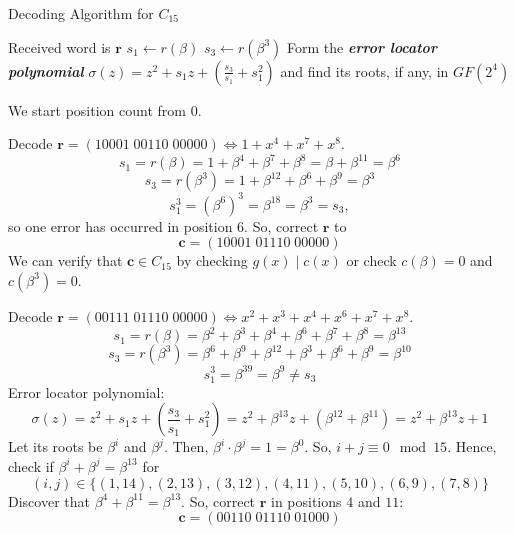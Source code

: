 \begin{algbox}
    \begin{algorithm}[H]
        \DontPrintSemicolon{}
        \caption{Decoding Algorithm for $ C_{15} $}
        Received word is $ \bm{r} $\;
        $ s_1\gets r(\beta) $\;
        $ s_3\gets r(\beta^3) $\;
         {
        }
         {
         {
        }
        }
         {
            \Return{}
        }
        Form the \textbf\emph{{error locator polynomial}}
        $ \sigma(z)=z^2+s_1z+\left( \frac{s_3}{s_1} +s_1^2 \right) $ and find its
        roots, if any, in $ GF(2^4) $\;
         {
        }
        \Return{}
    \end{algorithm}
\end{algbox}

\begin{remark}
    We start position count from $ 0 $.
\end{remark}

\begin{exbox}
    \begin{example}[Decoding $ C_{15} $]
        Decode $ \bm{r}=(10001\; 00110\; 00000)\iff 1+x^4+x^7+x^8 $.
        \[ s_1=r(\beta)=1+\beta^4+\beta^7+\beta^8=\beta+\beta^{11}=\beta^6 \]
        \[ s_3=r(\beta^3)=1+\beta^{12}+\beta^{6}+\beta^9=\beta^3 \]
        \[ s_1^3=(\beta^6)^3=\beta^{18}=\beta^3=s_3, \]
        so one error has occurred in position $ 6 $. So, correct $ \bm{r} $ to
        \[ \bm{c}=(10001\; 01110\; 00000) \]
        We can verify that $ \bm{c}\in C_{15} $ by checking $ g(x)\mid c(x) $
        or check $ c(\beta)=0 $ and $ c(\beta^3)=0 $.
    \end{example}
\end{exbox}

\begin{exbox}
    \begin{example}[Decoding $ C_{15} $]
        Decode $ \bm{r}=(00111\; 01110\; 00000)\iff x^2+x^3+x^4+x^6+x^7+x^8 $.
        \[ s_1=r(\beta)=\beta^2+\beta^3+\beta^4+\beta^6+\beta^7+\beta^8=\beta^{13} \]
        \[ s_3=r(\beta^3)=\beta^6+\beta^9+\beta^{12}+\beta^3+\beta^6+\beta^9=\beta^{10} \]
        \[ s_1^3=\beta^{39}=\beta^9\neq s_3 \]
        Error locator polynomial:
        \[ \sigma(z)=z^2+s_1z+\left(\frac{s_3}{s_1}+s_1^2 \right)
            =z^2+\beta^{13}z+(\beta^{12}+\beta^{11})=z^2+\beta^{13}z+1 \]
        Let its roots be $ \beta^i $ and $ \beta^j $. Then, $ \beta^i\cdot \beta^j=1=
            \beta^0 $. So, $ i+j\equiv 0\mod 15 $. Hence, check if $ \beta^i+\beta^j=\beta^{13} $
        for
        \[ (i,j)\in \{(1,14),(2,13),(3,12),(4,11),(5,10),(6,9),(7,8)\} \]
        Discover that $ \beta^4+\beta^{11}=\beta^{13} $. So, correct $ \bm{r} $
        in positions $ 4 $ and $ 11 $:
        \[ \bm{c}=(00110\; 01110\; 01000) \]
    \end{example}
\end{exbox}

